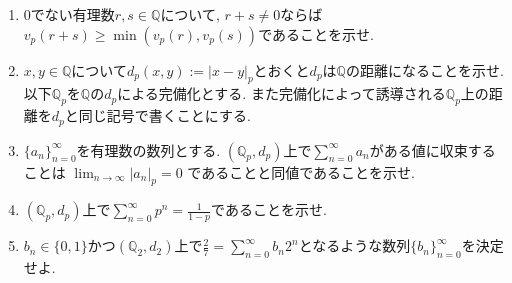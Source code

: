 \documentclass[dvipdfmx,a4paper,11pt]{article}
\newcommand{\Q}{\mathbb{Q}}
\theoremstyle{definition}
\begin{document}
\begin{enumerate}[label=\textbf{問}10.\arabic*]
\begin{enumerate}
\setlength{\parskip}{0cm}
  \setlength{\itemsep}{2pt} 
\item 0でない有理数$r,s \in \Q$について, $r+s \neq 0$ならば$v_{p}(r+s) \ge \min(v_{p}(r), v_{p}(s))$であることを示せ.
\item $x,y \in \Q$について$d_{p}(x,y) :=|x-y|_{p} $とおくと$d_{p}$は$\Q$の距離になることを示せ.
以下$\Q_p$を$\Q$の$d_{p}$による完備化とする. また完備化によって誘導される$\Q_p$上の距離を$d_{p}$と同じ記号で書くことにする.
\item $\{ a_{n}\}_{n=0}^{\infty}$を有理数の数列とする. $(\Q_p,d_{p})$上で$\sum_{n=0}^{\infty} a_n$がある値に収束することは
$\lim_{n \rightarrow \infty}|a_n|_{p} = 0$ であることと同値であることを示せ.
\item $(\Q_p,d_{p})$上で$\sum_{n=0}^{\infty} p^n = \frac{1}{1-p}$であることを示せ. %
\item $b_n \in \{0,1\}$かつ$(\Q_2,d_{2})$上で$\frac{2}{7} = \sum_{n=0}^{\infty} b_n 2^n$となるような数列$\{b_n\}_{n=0}^{\infty}$を決定せよ.
\end{enumerate}





 \end{enumerate}
 
\end{document}
